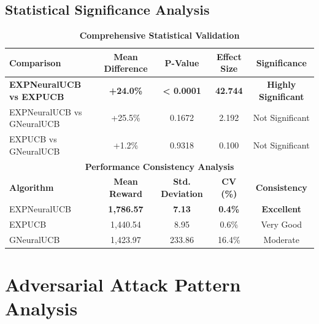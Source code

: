 \documentclass[11pt,a4paper]{article}
\newcommand{\performance}[1]{\textcolor{performancecolor}{\textbf{#1}}}
\newcommand{\success}[1]{\textcolor{successcolor}{\textbf{#1}}}
\begin{document}
\subsection{Statistical Significance Analysis}

\begin{table}[H]
\centering
\caption{\success{Comprehensive Statistical Validation}}
\begin{tabular}{|l|c|c|c|c|}
\hline
\textbf{Comparison} & \textbf{Mean Difference} & \textbf{P-Value} & \textbf{Effect Size} & \textbf{Significance} \\
\hline
\hline
\success{EXPNeuralUCB vs EXPUCB} & \success{+24.0\%} & \success{< 0.0001} & \success{42.744} & \success{Highly Significant} \\
EXPNeuralUCB vs GNeuralUCB & +25.5\% & 0.1672 & 2.192 & Not Significant \\
EXPUCB vs GNeuralUCB & +1.2\% & 0.9318 & 0.100 & Not Significant \\
\hline
\multicolumn{5}{|c|}{\textbf{Performance Consistency Analysis}} \\
\hline
\textbf{Algorithm} & \textbf{Mean Reward} & \textbf{Std. Deviation} & \textbf{CV (\%)} & \textbf{Consistency} \\
\hline
EXPNeuralUCB & \performance{1,786.57} & \performance{7.13} & \performance{0.4\%} & \success{Excellent} \\
EXPUCB & 1,440.54 & 8.95 & 0.6\% & Very Good \\
GNeuralUCB & 1,423.97 & 233.86 & 16.4\% & Moderate \\
\hline
\end{tabular}
\end{table}

\section{Adversarial Attack Pattern Analysis}
\end{document}
